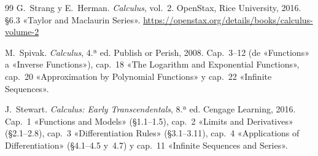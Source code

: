 \begin{thebibliography}{99}
G.~Strang y E.~Herman.
\newblock \emph{Calculus}, vol.~2.
\newblock OpenStax, Rice University, 2016.
\newblock §6.3 «Taylor and Maclaurin Series».
\newblock \url{https://openstax.org/details/books/calculus-volume-2}

M.~Spivak.
\newblock \emph{Calculus}, 4.ª ed.
\newblock Publish or Perish, 2008.
\newblock Cap.~3--12 (de «Functions» a «Inverse Functions»), cap.~18 «The Logarithm and Exponential Functions», cap.~20 «Approximation by Polynomial Functions» y cap.~22 «Infinite Sequences».

J.~Stewart.
\newblock \emph{Calculus: Early Transcendentals}, 8.ª ed.
\newblock Cengage Learning, 2016.
\newblock Cap.~1 «Functions and Models» (§1.1--1.5), cap.~2 «Limits and Derivatives» (§2.1--2.8), cap.~3 «Differentiation Rules» (§3.1--3.11), cap.~4 «Applications of Differentiation» (§4.1--4.5 y~4.7) y cap.~11 «Infinite Sequences and Series».

\end{thebibliography}
